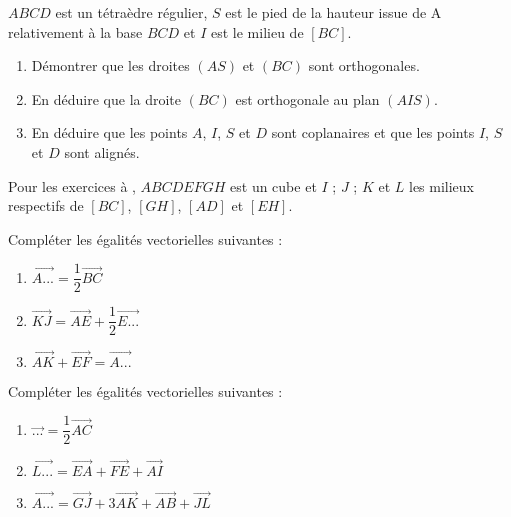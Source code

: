 \documentclass{cornouaille}
\begin{document}
\begin{colonne*exercice}
\begin{exercice}\label{G2Exo36}
  $ABCD$ est un tétraèdre régulier, $S$ est le pied de la hauteur
  issue de A relativement à la base $BCD$ et $I$ est le milieu de
  $[BC]$.

  \begin{center}
    
  \end{center}

  \begin{enumerate}
  \item Démontrer que les droites $(AS)$ et $(BC)$ sont orthogonales.
  \item En déduire que la droite $(BC)$ est orthogonale au plan
    $(AIS)$.
  \item En déduire que les points $A$, $I$, $S$ et $D$ sont
    coplanaires et que les points $I$, $S$ et $D$ sont alignés.
  \end{enumerate}
\end{exercice}


Pour les exercices  à , $ABCDEFGH$ est un cube et $I$ ; $J$ ; $K$
et $L$ les milieux respectifs de $[BC]$, $[GH]$, $[AD]$ et $[EH]$.

\begin{center}
  
\end{center}

\begin{exercice}\label{G2Exo37}
  Compléter les égalités vectorielles suivantes :
  \begin{enumerate}
  \item $\overrightarrow{A...}=\dfrac{1}{2}\overrightarrow{BC}$
  \item
    $\overrightarrow{KJ}=\overrightarrow{AE}+\dfrac{1}{2}\overrightarrow{E...}$
  \item
    $\overrightarrow{AK}+\overrightarrow{EF}=\overrightarrow{A...}$
  \end{enumerate}
\end{exercice}

\begin{exercice}
  Compléter les égalités vectorielles suivantes :
  \begin{enumerate}
  \item $\overrightarrow{...}=\dfrac{1}{2}\overrightarrow{AC}$
  \item
    $\overrightarrow{L...}=\overrightarrow{EA}+\overrightarrow{FE}+\overrightarrow{AI}$
  \item
    $\overrightarrow{A...}=\overrightarrow{GJ}+3\overrightarrow{AK}+\overrightarrow{AB}+\overrightarrow{JL}$
  \end{enumerate}
\end{exercice}


\end{colonne*exercice}
\end{document}
